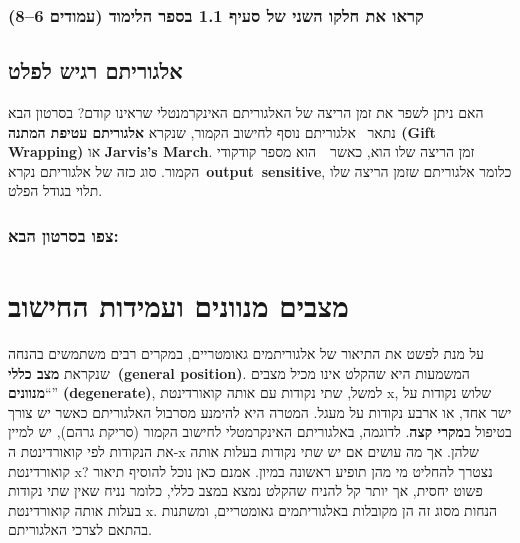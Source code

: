 \documentclass[
]{book}
\theoremstyle{definition}
\theoremstyle{definition}
\theoremstyle{definition}
\theoremstyle{definition}
\theoremstyle{remark}
\begin{document}
\hypertarget{ux5e7ux5e8ux5d0ux5d5-ux5d0ux5ea-ux5d7ux5dcux5e7ux5d5-ux5d4ux5e9ux5e0ux5d9-ux5e9ux5dc-ux5e1ux5e2ux5d9ux5e3-1.1-ux5d1ux5e1ux5e4ux5e8-ux5d4ux5dcux5d9ux5deux5d5ux5d3-ux5e2ux5deux5d5ux5d3ux5d9ux5dd-68}{%
\subsubsection{קראו את חלקו השני של סעיף 1.1 בספר הלימוד (עמודים 6--8)}\label{ux5e7ux5e8ux5d0ux5d5-ux5d0ux5ea-ux5d7ux5dcux5e7ux5d5-ux5d4ux5e9ux5e0ux5d9-ux5e9ux5dc-ux5e1ux5e2ux5d9ux5e3-1.1-ux5d1ux5e1ux5e4ux5e8-ux5d4ux5dcux5d9ux5deux5d5ux5d3-ux5e2ux5deux5d5ux5d3ux5d9ux5dd-68}}

\hypertarget{ux5d0ux5dcux5d2ux5d5ux5e8ux5d9ux5eaux5dd-ux5e8ux5d2ux5d9ux5e9-ux5dcux5e4ux5dcux5d8}{%
\subsection{\texorpdfstring{\textbf{אלגוריתם רגיש לפלט}}{אלגוריתם רגיש לפלט}}\label{ux5d0ux5dcux5d2ux5d5ux5e8ux5d9ux5eaux5dd-ux5e8ux5d2ux5d9ux5e9-ux5dcux5e4ux5dcux5d8}}

האם ניתן לשפר את זמן הריצה של האלגוריתם האינקרמנטלי שראינו קודם? בסרטון הבא נתאר~ אלגוריתם נוסף לחישוב הקמור, שנקרא \textbf{אלגוריתם עטיפת המתנה (Gift Wrapping)} או \textbf{Jarvis's March}. זמן הריצה שלו הוא, כאשר~~הוא מספר קודקודי הקמור. סוג כזה של אלגוריתם נקרא~\textbf{output~sensitive}, כלומר אלגוריתם שזמן הריצה שלו תלוי בגודל הפלט.

\hypertarget{ux5e6ux5e4ux5d5-ux5d1ux5e1ux5e8ux5d8ux5d5ux5df-ux5d4ux5d1ux5d0-1}{%
\subsubsection{צפו בסרטון הבא:}\label{ux5e6ux5e4ux5d5-ux5d1ux5e1ux5e8ux5d8ux5d5ux5df-ux5d4ux5d1ux5d0-1}}

\hypertarget{ux5deux5e6ux5d1ux5d9ux5dd-ux5deux5e0ux5d5ux5d5ux5e0ux5d9ux5dd-ux5d5ux5e2ux5deux5d9ux5d3ux5d5ux5ea-ux5d4ux5d7ux5d9ux5e9ux5d5ux5d1}{%
\section{\texorpdfstring{\textbf{מצבים מנוונים ועמידות החישוב}}{מצבים מנוונים ועמידות החישוב}}\label{ux5deux5e6ux5d1ux5d9ux5dd-ux5deux5e0ux5d5ux5d5ux5e0ux5d9ux5dd-ux5d5ux5e2ux5deux5d9ux5d3ux5d5ux5ea-ux5d4ux5d7ux5d9ux5e9ux5d5ux5d1}}

על מנת לפשט את התיאור של אלגוריתמים גאומטריים, במקרים רבים משתמשים בהנחה שנקראת \textbf{מצב כללי~(general position)}. המשמעות היא שהקלט אינו מכיל מצבים ``\textbf{מנוונים}'' \textbf{(degenerate)}, למשל, שתי נקודות עם אותה קואורדינטת x, שלוש נקודות על ישר אחד, או ארבע נקודות על מעגל. המטרה היא להימנע מסרבול האלגוריתם כאשר יש צורך בטיפול ב\textbf{מקרי קצה}. לדוגמה, באלגוריתם האינקרמטלי לחישוב הקמור (סריקת גרהם), יש למיין את הנקודות לפי קואורדינטת ה-x שלהן. אך מה עושים אם יש שתי נקודות בעלות אותה קואורדינטת x? נצטרך להחליט מי מהן תופיע ראשונה במיון. אמנם כאן נוכל להוסיף תיאור פשוט יחסית, אך יותר קל להניח שהקלט נמצא במצב כללי, כלומר נניח שאין שתי נקודות בעלות אותה קואורדינטת x. הנחות מסוג זה הן מקובלות באלגוריתמים גאומטריים, ומשתנות בהתאם לצרכי האלגוריתם.
\end{document}
